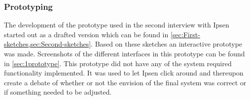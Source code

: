 \subsubsection*{Prototyping}
The development of the prototype used in the second interview with Ipsen started out as a drafted version which can be found in \cref{sec:First-sketches,sec:Second-sketches}.
Based on these sketches an interactive prototype was made. 
Screenshots of the different interfaces in this prototype can be found in \cref{sec:1prototype}.
This prototype did not have any of the system required functionality implemented.
It was used to let Ipsen click around and thereupon create a debate of whether or not the envision of the final system was correct or if something needed to be adjusted.









